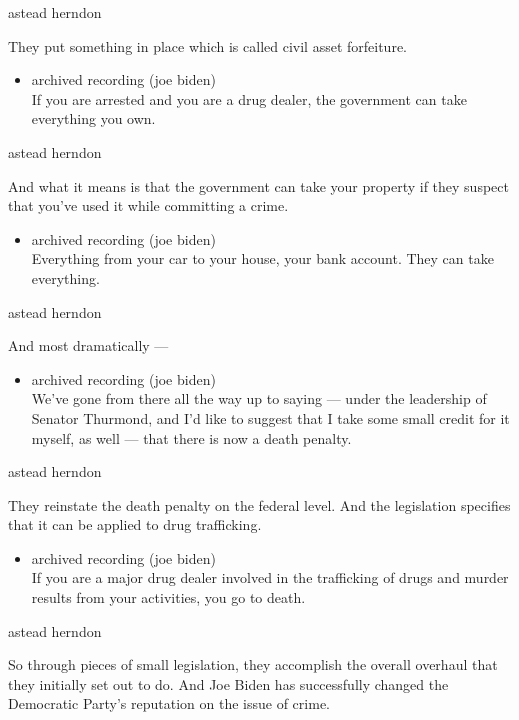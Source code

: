 astead herndon

They put something in place which is called civil asset forfeiture.

\begin{itemize}
\tightlist
\item
  archived recording (joe biden)\\
  If you are arrested and you are a drug dealer, the government can take
  everything you own.
\end{itemize}

astead herndon

And what it means is that the government can take your property if they
suspect that you've used it while committing a crime.

\begin{itemize}
\tightlist
\item
  archived recording (joe biden)\\
  Everything from your car to your house, your bank account. They can
  take everything.
\end{itemize}

astead herndon

And most dramatically ---

\begin{itemize}
\tightlist
\item
  archived recording (joe biden)\\
  We've gone from there all the way up to saying --- under the
  leadership of Senator Thurmond, and I'd like to suggest that I take
  some small credit for it myself, as well --- that there is now a death
  penalty.
\end{itemize}

astead herndon

They reinstate the death penalty on the federal level. And the
legislation specifies that it can be applied to drug trafficking.

\begin{itemize}
\tightlist
\item
  archived recording (joe biden)\\
  If you are a major drug dealer involved in the trafficking of drugs
  and murder results from your activities, you go to death.
\end{itemize}

astead herndon

So through pieces of small legislation, they accomplish the overall
overhaul that they initially set out to do. And Joe Biden has
successfully changed the Democratic Party's reputation on the issue of
crime.

